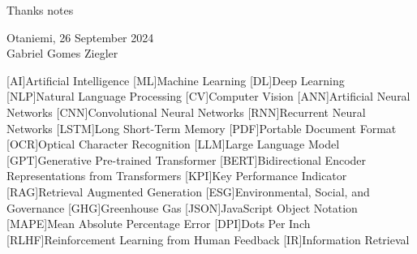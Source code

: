 \documentclass[english, 12pt, a4paper, elec, utf8, a-2b, online]{aaltothesis}
\begin{document}

\begin{abstractpage}[finnish]
\end{abstractpage}

\dothesispagenumbering{}


Thanks notes

\vspace{5cm}
Otaniemi, 26 September 2024\\

\vspace{5mm}
{\hfill Gabriel Gomes Ziegler \hspace{1cm}}

\newpage


\thesistableofcontents

\cleardoublepage

\newpage

[AI]{Artificial Intelligence}
[ML]{Machine Learning}
[DL]{Deep Learning}
[NLP]{Natural Language Processing}
[CV]{Computer Vision}
[ANN]{Artificial Neural Networks}
[CNN]{Convolutional Neural Networks}
[RNN]{Recurrent Neural Networks}
[LSTM]{Long Short-Term Memory}
[PDF]{Portable Document Format}
[OCR]{Optical Character Recognition}
[LLM]{Large Language Model}
[GPT]{Generative Pre-trained Transformer}
[BERT]{Bidirectional Encoder Representations from Transformers}
[KPI]{Key Performance Indicator}
[RAG]{Retrieval Augmented Generation}
[ESG]{Environmental, Social, and Governance}
[GHG]{Greenhouse Gas}
[JSON]{JavaScript Object Notation}
[MAPE]{Mean Absolute Percentage Error}
[DPI]{Dots Per Inch}
[RLHF]{Reinforcement Learning from Human Feedback}
[IR]{Information Retrieval}
\end{document}
